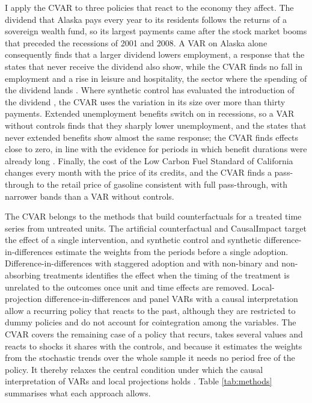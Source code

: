 \documentclass[12pt,a4paper]{article}
\theoremstyle{definition}
\theoremstyle{definition}\newtheorem{example}{Example}
\theoremstyle{definition}\newtheorem{definition}{Definition}
\begin{document}
I apply the CVAR to three policies that react to the economy they affect. The dividend that Alaska pays every year to its residents follows the returns of a sovereign wealth fund, so its largest payments came after the stock market booms that preceded the recessions of 2001 and 2008. A VAR on Alaska alone consequently finds that a larger dividend lowers employment, a response that the states that never receive the dividend also show, while the CVAR finds no fall in employment and a rise in leisure and hospitality, the sector where the spending of the dividend lands \citep{Kueng2018}. Where synthetic control has evaluated the introduction of the dividend \citep{JonesMarinescu2022}, the CVAR uses the variation in its size over more than thirty payments. Extended unemployment benefits switch on in recessions, so a VAR without controls finds that they sharply lower unemployment, and the states that never extended benefits show almost the same response; the CVAR finds effects close to zero, in line with the evidence for periods in which benefit durations were already long \citep{AcostaEtAl2025}. Finally, the cost of the Low Carbon Fuel Standard of California changes every month with the price of its credits, and the CVAR finds a pass-through to the retail price of gasoline consistent with full pass-through, with narrower bands than a VAR without controls.

The CVAR belongs to the methods that build counterfactuals for a treated time series from untreated units. The artificial counterfactual \citep{CarvalhoMasiniMedeiros2018,MasiniMedeiros2021} and CausalImpact \citep{Brodersen2015} target the effect of a single intervention, and synthetic control \citep{Abadie2010} and synthetic difference-in-differences \citep{Arkhangelsky2021} estimate the weights from the periods before a single adoption. Difference-in-differences with staggered adoption \citep{callawaysantannamultipletime2021,sunabraham2021} and with non-binary and non-absorbing treatments \citep{callawaysantannabacon2021,deChaisemartinDHaultfoeuille2020} identifies the effect when the timing of the treatment is unrelated to the outcomes once unit and time effects are removed. Local-projection difference-in-differences \citep{dube2023local} and panel VARs with a causal interpretation \citep{pala2024pvarcontrol} allow a recurring policy that reacts to the past, although they are restricted to dummy policies and do not account for cointegration among the variables. The CVAR covers the remaining case of a policy that recurs, takes several values and reacts to shocks it shares with the controls, and because it estimates the weights from the stochastic trends over the whole sample it needs no period free of the policy. It thereby relaxes the central condition under which the causal interpretation of VARs and local projections holds \citep{RambachanSheppard2021,GoncalvesHerreraKilianPesavento2021,kolesar2024dynamic}. Table \ref{tab:methods} summarises what each approach allows.
\end{document}
